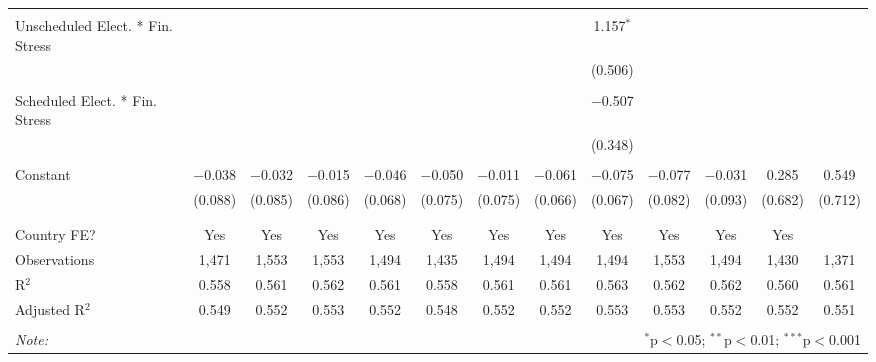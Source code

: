 \begin{table}[!htbp]
\begin{tabular}{@{\extracolsep{5pt}}lcccccccccccc}
  & & & & & & & & & & & & \\ 
 Unscheduled Elect. * Fin. Stress &  &  &  &  &  &  &  & 1.157$^{*}$ &  &  &  &  \\ 
  &  &  &  &  &  &  &  & (0.506) &  &  &  &  \\ 
  & & & & & & & & & & & & \\ 
 Scheduled Elect. * Fin. Stress &  &  &  &  &  &  &  & $-$0.507 &  &  &  &  \\ 
  &  &  &  &  &  &  &  & (0.348) &  &  &  &  \\ 
  & & & & & & & & & & & & \\ 
 Constant & $-$0.038 & $-$0.032 & $-$0.015 & $-$0.046 & $-$0.050 & $-$0.011 & $-$0.061 & $-$0.075 & $-$0.077 & $-$0.031 & 0.285 & 0.549 \\ 
  & (0.088) & (0.085) & (0.086) & (0.068) & (0.075) & (0.075) & (0.066) & (0.067) & (0.082) & (0.093) & (0.682) & (0.712) \\ 
  & & & & & & & & & & & & \\ 
\hline \\[-1.8ex] 
Country FE? & Yes & Yes & Yes & Yes & Yes & Yes & Yes & Yes & Yes & Yes & Yes &  \\ 
Observations & 1,471 & 1,553 & 1,553 & 1,494 & 1,435 & 1,494 & 1,494 & 1,494 & 1,553 & 1,494 & 1,430 & 1,371 \\ 
R$^{2}$ & 0.558 & 0.561 & 0.562 & 0.561 & 0.558 & 0.561 & 0.561 & 0.563 & 0.562 & 0.562 & 0.560 & 0.561 \\ 
Adjusted R$^{2}$ & 0.549 & 0.552 & 0.553 & 0.552 & 0.548 & 0.552 & 0.552 & 0.553 & 0.553 & 0.552 & 0.552 & 0.551 \\ 
\hline 
\hline \\[-1.8ex] 
\textit{Note:}  & \multicolumn{12}{r}{$^{*}$p$<$0.05; $^{**}$p$<$0.01; $^{***}$p$<$0.001} \\ 
\end{tabular} 
\end{table} 
